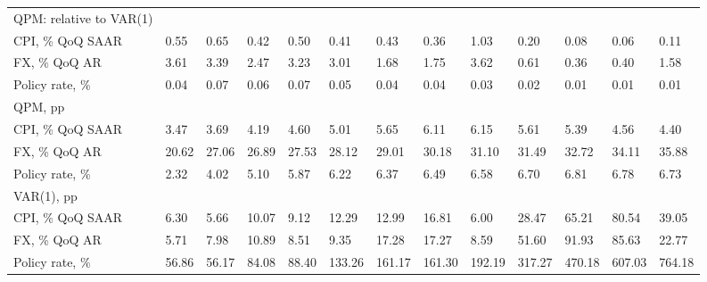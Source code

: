 \documentclass[12pt]{article}
\begin{document}
\begin{table}[!htbp]
    \begin{adjustbox}{width=1\linewidth}
\begin{tabular}{lllllllllllll}
QPM: relative to VAR(1) &       &       &       &       &        &        &        &        &        &        &        &        \\
CPI, \% QoQ SAAR        & 0.55  & 0.65  & 0.42  & 0.50  & 0.41   & 0.43   & 0.36   & 1.03   & 0.20   & 0.08   & 0.06   & 0.11   \\
FX, \% QoQ AR           & 3.61  & 3.39  & 2.47  & 3.23  & 3.01   & 1.68   & 1.75   & 3.62   & 0.61   & 0.36   & 0.40   & 1.58   \\
Policy rate, \%         & 0.04  & 0.07  & 0.06  & 0.07  & 0.05   & 0.04   & 0.04   & 0.03   & 0.02   & 0.01   & 0.01   & 0.01   \\
QPM, pp                 &       &       &       &       &        &        &        &        &        &        &        &        \\
CPI, \% QoQ SAAR        & 3.47  & 3.69  & 4.19  & 4.60  & 5.01   & 5.65   & 6.11   & 6.15   & 5.61   & 5.39   & 4.56   & 4.40   \\
FX, \% QoQ AR           & 20.62 & 27.06 & 26.89 & 27.53 & 28.12  & 29.01  & 30.18  & 31.10  & 31.49  & 32.72  & 34.11  & 35.88  \\
Policy rate, \%         & 2.32  & 4.02  & 5.10  & 5.87  & 6.22   & 6.37   & 6.49   & 6.58   & 6.70   & 6.81   & 6.78   & 6.73   \\
VAR(1), pp              &       &       &       &       &        &        &        &        &        &        &        &        \\
CPI, \% QoQ SAAR        & 6.30  & 5.66  & 10.07 & 9.12  & 12.29  & 12.99  & 16.81  & 6.00   & 28.47  & 65.21  & 80.54  & 39.05  \\
FX, \% QoQ AR           & 5.71  & 7.98  & 10.89 & 8.51  & 9.35   & 17.28  & 17.27  & 8.59   & 51.60  & 91.93  & 85.63  & 22.77  \\
Policy rate, \%         & 56.86 & 56.17 & 84.08 & 88.40 & 133.26 & 161.17 & 161.30 & 192.19 & 317.27 & 470.18 & 607.03 & 764.18
\end{tabular}
\end{adjustbox}
\end{table}



\end{document}
